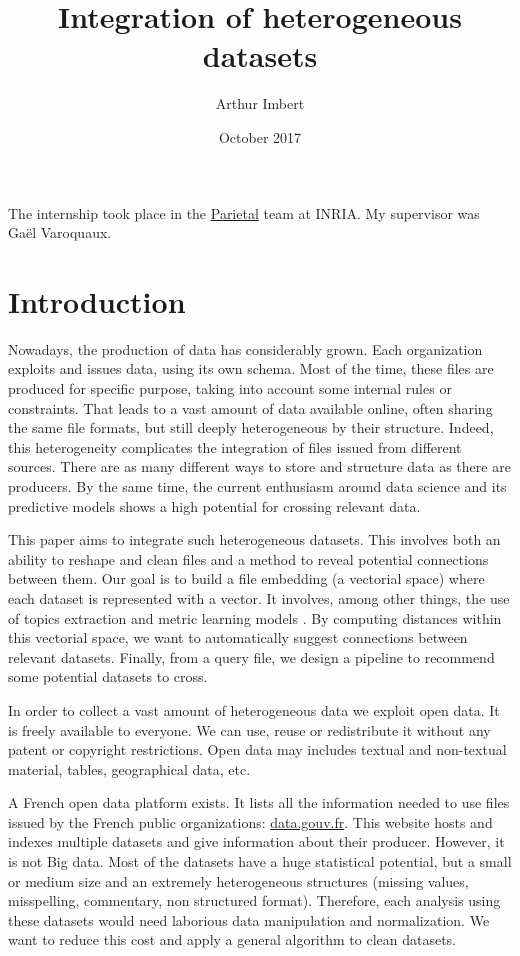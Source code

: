\documentclass[a4paper]{article}
\author{Arthur Imbert}
\title{Integration of heterogeneous datasets}
\date{October 2017}
\begin{document}
	
	\maketitle
	
	The internship took place in the \href{https://team.inria.fr/parietal/}{Parietal} team at INRIA. My supervisor was Ga\"el Varoquaux.
	
	\section{Introduction}
	
	Nowadays, the production of data has considerably grown. Each organization exploits and issues data, using its own schema. Most of the time, these files are produced for specific purpose, taking into account some internal rules or constraints. That leads to a vast amount of data available online, often sharing the same file formats, but still deeply heterogeneous by their structure. Indeed, this heterogeneity complicates the integration of files issued from different sources. There are as many different ways to store and structure data as there are producers. By the same time, the current enthusiasm around data science and its predictive models shows a high potential for crossing relevant data. 
		
	This paper aims to integrate such heterogeneous datasets. This involves both an ability to reshape and clean files and a method to reveal potential connections between them. Our goal is to build a file embedding (a vectorial space) where each dataset is represented with a vector. It involves, among other things, the use of topics extraction \cite{ref2} and metric learning models \cite{ref3}. By computing distances within this vectorial space, we want to automatically suggest connections between relevant datasets. Finally, from a query file, we design a pipeline to recommend some potential datasets to cross.
	
	In order to collect a vast amount of heterogeneous data we exploit open data. It is freely available to everyone. We can use, reuse or redistribute it without any patent or copyright restrictions. Open data may includes textual and non-textual material, tables, geographical data, etc. 
	
	A French open data platform exists. It lists all the information needed to use files issued by the French public organizations: \href{http://www.data.gouv.fr/fr/}{data.gouv.fr}. This website hosts and indexes multiple datasets and give information about their producer. However, it is not Big data. Most of the datasets have a huge statistical potential, but a small or medium size and an extremely heterogeneous structures (missing values, misspelling, commentary, non structured format). Therefore, each analysis using these datasets would need laborious data manipulation and normalization. We want to reduce this cost and apply a general algorithm to clean datasets.
	
\end{document}
